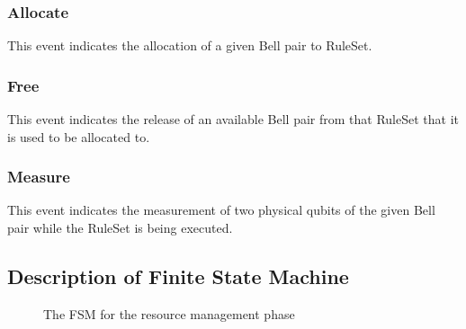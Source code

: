 \subsubsection{Allocate}
This event indicates the allocation of a given Bell pair to RuleSet.

\subsubsection{Free}
This event indicates the release of an available Bell pair from that RuleSet that it is used to be allocated to.

\subsubsection{Measure}
This event indicates the measurement of two physical qubits of the given Bell pair while the RuleSet is being executed.

\subsection{Description of Finite State Machine}

\begin{figure}[ht] %
  \centering %
  \caption{The FSM for the resource management phase}
  \label{fig:my_label}
\end{figure}


